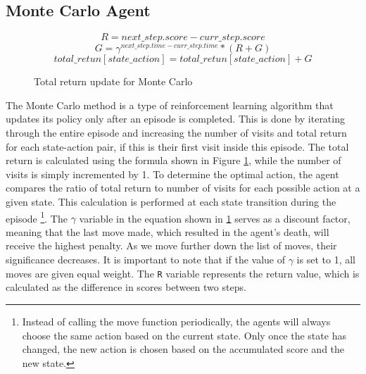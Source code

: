\subsection{Monte Carlo Agent}
\begin{figure}[h]
    $$ R = next\_step.score - curr\_step.score $$
    	$$ G = \gamma^{next\_step.time - curr\_step.time} * (R + G) $$
    	$$ total\_retun[state\_action] = total\_retun[state\_action] + G $$
    \caption{Total return update for Monte Carlo}
    \label{mcUpdate}
\end{figure}
The Monte Carlo method is a type of reinforcement learning algorithm that updates its policy only after an episode is completed. This is done by iterating through the entire episode and increasing the number of visits and total return for each state-action pair, if this is their first visit inside this episode. The total return is calculated using the formula shown in Figure \ref{mcUpdate}, while the number of visits is simply incremented by 1. To determine the optimal action, the agent compares the ratio of total return to number of visits for each possible action at a given state. This calculation is performed at each state transition during the episode \footnote{Instead of calling the move function periodically, the agents will always choose the same action based on the current state. Only once the state has changed, the new action is chosen based on the accumulated score and the new state.}.
The $\gamma$ variable in the equation shown in \ref{mcUpdate} serves as a discount factor, meaning that the last move made, which resulted in the agent's death, will receive the highest penalty. As we move further down the list of moves, their significance decreases. It is important to note that if the value of $\gamma$ is set to 1, all moves are given equal weight. The \texttt{R} variable represents the return value, which is calculated as the difference in scores between two steps.
